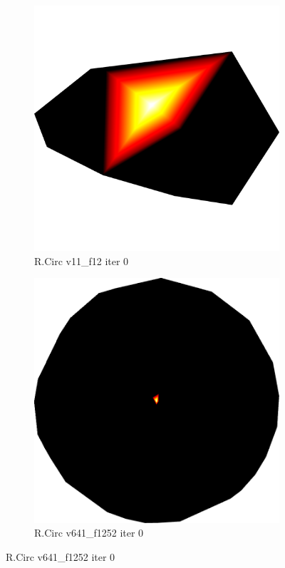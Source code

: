 \begin{figure}[ht]
{	\bigskip
	\begin{subfigure}[b]{0.48\linewidth}
		\includegraphics[width=1.0\linewidth,height=0.3\textheight,keepaspectratio]{data/synthetic_meshes/random_circle_tessellation_Dirac_delta_1_v11_f12_funcvals_0iter.png}
		\caption{R.Circ v11\_f12 iter 0}\label{fig:rcirc.c}
	\end{subfigure}
	\begin{subfigure}[b]{0.48\linewidth}
		\includegraphics[width=1.0\linewidth,height=0.3\textheight,keepaspectratio]{data/synthetic_meshes/random_circle_tessellation_Dirac_delta_10_v641_f1252_funcvals_0iter.png}
		\caption{R.Circ v641\_f1252 iter 0}\label{fig:rcirc.d}
	\end{subfigure}

}
\end{figure}
